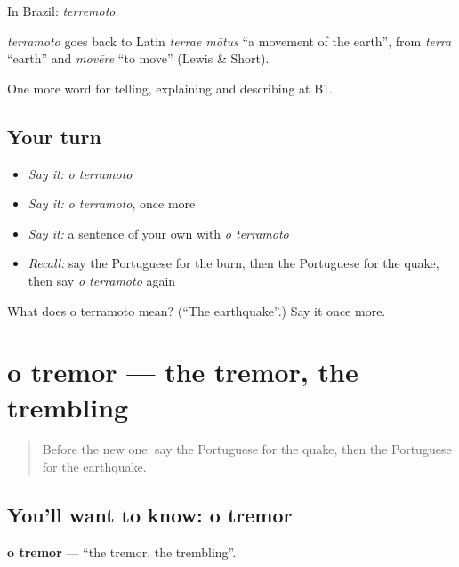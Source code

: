 In Brazil: \emph{terremoto}.

\begin{cousinweb}
\emph{terramoto} goes back to Latin \emph{terrae mōtus} \textquotedblleft{}a movement of the earth\textquotedblright{}, from \emph{terra} \textquotedblleft{}earth\textquotedblright{} and \emph{movēre} \textquotedblleft{}to move\textquotedblright{} (Lewis \& Short).
\end{cousinweb}

\begin{grammarlens}[title={What you've built}]
One more word for telling, explaining and describing at B1.
\end{grammarlens}

\subsection*{Your turn}
\begin{itemize}
\raggedright
  \item \emph{Say it:} \emph{o terramoto}
  \item \emph{Say it:} \emph{o terramoto}, once more
  \item \emph{Say it:} a sentence of your own with \emph{o terramoto}
  \item \emph{Recall:} say the Portuguese for the burn, then the Portuguese for the quake, then say \emph{o terramoto} again
\end{itemize}

\begin{tcolorbox}[breakable,colback=teal!4,colframe=teal!35!black,title={Before you move on}]
What does o terramoto mean? (\textquotedblleft{}The earthquake\textquotedblright{}.) Say it once more.
\end{tcolorbox}
\section[o tremor]{o tremor — the tremor, the trembling}

\label{lesson:PT-C302-tremor}



\begin{quote}
Before the new one: say the Portuguese for the quake, then the Portuguese for the earthquake.
\end{quote}

\subsection*{You'll want to know: o tremor}
\textbf{o tremor} — \textquotedblleft{}the tremor, the trembling\textquotedblright{}.

